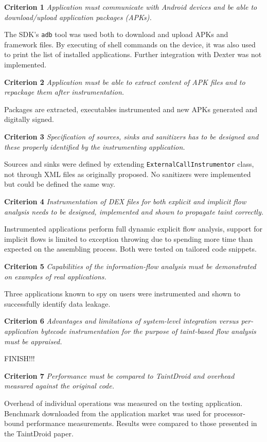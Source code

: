 \documentclass[12pt,twoside,notitlepage]{report}
\begin{document}
\begin{description}
	\item \textbf{Criterion 1} \emph{Application must communicate with Android devices and be able to download/upload application packages (APKs).}

	The SDK's \verb$adb$ tool was used both to download and upload APKs and framework files. By executing of shell commands on the device, it was also used to print the list of installed applications. Further integration with Dexter was not implemented.

	\item \textbf{Criterion 2} \emph{Application must be able to extract content of APK files and to repackage them after instrumentation.}

	Packages are extracted, executables instrumented and new APKs generated and digitally signed.

	\item \textbf{Criterion 3} \emph{Specification of sources, sinks and sanitizers has to be designed and these properly identified by the instrumenting application.}

	Sources and sinks were defined by extending \verb$ExternalCallInstrumentor$ class, not through XML files as originally proposed. No sanitizers were implemented but could be defined the same way.

	\item \textbf{Criterion 4} \emph{Instrumentation of DEX files for both explicit and implicit flow analysis needs to be designed, implemented and shown to propagate taint correctly.}

	Instrumented applications perform full dynamic explicit flow analysis, support for implicit flows is limited to exception throwing due to spending more time than expected on the assembling process. Both were tested on tailored code snippets.

	\item \textbf{Criterion 5} \emph{Capabilities of the information-flow analysis must be demonstrated on examples of real applications.}

	Three applications known to spy on users were instrumented and shown to successfully identify data leakage. 
      
	\item \textbf{Criterion 6} \emph{Advantages and limitations of system-level integration versus per-application bytecode instrumentation for the purpose of taint-based flow analysis must be appraised.}

	FINISH!!!

	\item \textbf{Criterion 7} \emph{Performance must be compared to TaintDroid and overhead measured against the original code.}

	Overhead of individual operations was measured on the testing application. Benchmark downloaded from the application market was used for processor-bound performance measurements. Results were compared to those presented in the TaintDroid paper.
\end{description}
\end{document}
